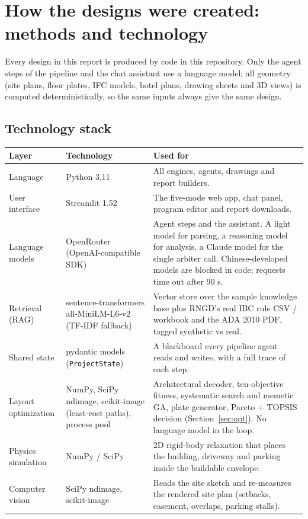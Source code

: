 \documentclass[10pt]{article}
\begin{document}
\section{How the designs were created: methods and technology}
\label{sec:methods}
Every design in this report is produced by code in this repository. Only the agent steps of the pipeline and the chat
assistant use a language model; all geometry (site plans, floor plates, IFC models, hotel plans, drawing sheets and
3D views) is computed deterministically, so the same inputs always give the same design.

\subsection{Technology stack}
{\small
\begin{longtable}{p{3.6cm}p{4.4cm}p{8cm}}\toprule
\textbf{Layer} & \textbf{Technology} & \textbf{Used for} \\ \midrule \endhead
Language & Python 3.11 & All engines, agents, drawings and report builders. \\
User interface & Streamlit 1.52 & The five-mode web app, chat panel, program editor and report downloads. \\
Language models & OpenRouter (OpenAI-compatible SDK) & Agent steps and the assistant. A light model for parsing, a reasoning model for analysis, a Claude model for the single arbiter call. Chinese-developed models are blocked in code; requests time out after 90 s. \\
Retrieval (RAG) & sentence-transformers all-MiniLM-L6-v2 (TF-IDF fallback) & Vector store over the sample knowledge base plus RNGD's real IBC rule CSV / workbook and the ADA 2010 PDF, tagged synthetic vs real. \\
Shared state & pydantic models (\texttt{ProjectState}) & A blackboard every pipeline agent reads and writes, with a full trace of each step. \\
Layout optimization & NumPy, SciPy ndimage, scikit-image (least-cost paths), process pool & Architectural decoder, ten-objective fitness, systematic search and memetic GA, plate generator, Pareto + TOPSIS decision (Section~\ref{sec:opt}). No language model in the loop. \\
Physics simulation & NumPy / SciPy & 2D rigid-body relaxation that places the building, driveway and parking inside the buildable envelope. \\
Computer vision & SciPy ndimage, scikit-image & Reads the site sketch and re-measures the rendered site plan (setbacks, easement, overlaps, parking stalls). \\

\end{longtable}}
\end{document}
